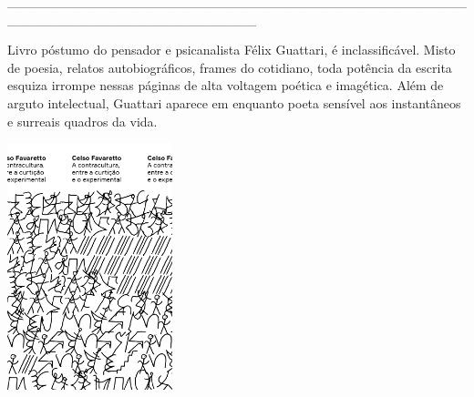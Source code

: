 {\hspace*{-2cm}\_\_\_\_\_\_\_\_\_\_\_\_\_\_\_\_\_\_\_\_\_\_\_\_\_\_\_\_\_\_\_\_\_\_\_\_\_\_\_\_\_\_\_\_\_\_\_\_\_\_\_\_\_\_\_\_\_\_\_\_\_\_\_\_\_\_\_\_\_\_\_\_\_\_

\medskip

\noindent{}Livro póstumo do pensador e psicanalista Félix Guattari, {} é inclassificável. Misto de poesia, relatos autobiográficos, frames do cotidiano, toda potência da escrita esquiza irrompe nessas páginas de alta voltagem poética e imagética. Além de arguto intelectual, Guattari aparece em {} enquanto poeta sensível aos instantâneos e surreais quadros da vida.

\vfill

\hspace*{-.4cm}\begin{minipage}[c]{0.90\linewidth}
\small{
{}}
\end{minipage}

\pagebreak

\hspace{.5cm}

\begin{center}
\hspace*{-2.5cm}
\hspace*{1.5cm}\includegraphics[width=48mm]{./imgs/favaretto.png}
\end{center}

}
